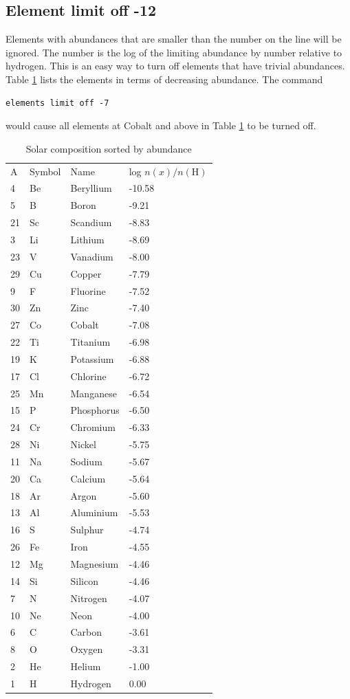 \subsection{Element limit off -12}
\label{sec:ElementLimitOffCommand}

\noindent Elements with abundances that are
smaller than the number on the line will be ignored.
The number is the log of the limiting abundance by number relative to
hydrogen.
This is an easy way to turn off elements that have trivial
abundances.
Table \ref{tab:CompositionDecreasingOrder} lists the elements
in terms of decreasing abundance.
The command
\begin{verbatim}
elements limit off -7
\end{verbatim}
would cause all elements at Cobalt and above in
Table \ref{tab:CompositionDecreasingOrder} to be turned off.

\begin{table}
\centering
\caption{Solar composition sorted by abundance}
\begin{tabular}{llll}
\hline
\label{tab:CompositionDecreasingOrder}
A& Symbol& Name& log $n(x)/n(\mathrm{H})$\\
4& Be& Beryllium& -10.58\\
5& B& Boron& -9.21\\
21& Sc& Scandium& -8.83\\
3& Li& Lithium& -8.69\\
23& V& Vanadium& -8.00\\
29& Cu& Copper& -7.79\\
9& F& Fluorine& -7.52\\
30& Zn& Zinc& -7.40\\
27& Co& Cobalt& -7.08\\
22& Ti& Titanium& -6.98\\
19& K& Potassium& -6.88\\
17& Cl& Chlorine& -6.72\\
25& Mn& Manganese& -6.54\\
15& P& Phosphorus& -6.50\\
24& Cr& Chromium& -6.33\\
28& Ni& Nickel& -5.75\\
11& Na& Sodium& -5.67\\
20& Ca& Calcium& -5.64\\
18& Ar& Argon& -5.60\\
13& Al& Aluminium& -5.53\\
16& S& Sulphur& -4.74\\
26& Fe& Iron& -4.55\\
12& Mg& Magnesium& -4.46\\
14& Si& Silicon& -4.46\\
7& N& Nitrogen& -4.07\\
10& Ne& Neon& -4.00\\
6& C& Carbon& -3.61\\
8& O& Oxygen& -3.31\\
2& He& Helium& -1.00\\
1& H& Hydrogen& 0.00\\
\hline
\end{tabular}
\end{table}

